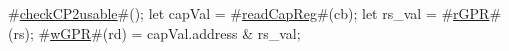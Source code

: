 #\hyperref[sailMIPSzcheckCP2usable]{checkCP2usable}#();
let capVal = #\hyperref[sailMIPSzreadCapReg]{readCapReg}#(cb);
let rs_val = #\hyperref[sailMIPSzrGPR]{rGPR}#(rs);
#\hyperref[sailMIPSzwGPR]{wGPR}#(rd) = capVal.address & rs_val;
